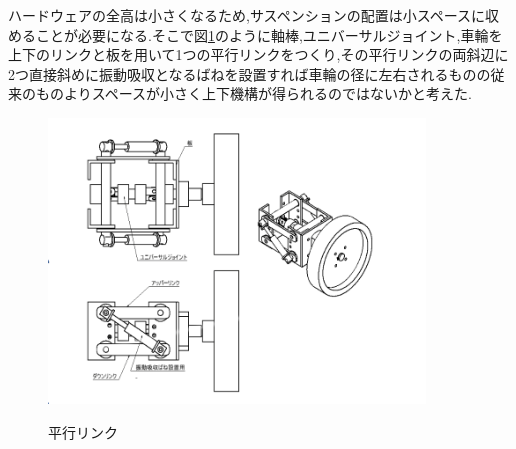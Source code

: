 \documentclass[12pt,oneside]{sotsuken_paper}
\begin{document}
ハードウェアの全高は小さくなるため,サスペンションの配置は小スペースに収めることが必要になる.そこで図\ref{fig:box}のように軸棒,ユニバーサルジョイント,車輪を上下のリンクと板を用いて1つの平行リンクをつくり,その平行リンクの両斜辺に2つ直接斜めに振動吸収となるばねを設置すれば車輪の径に左右されるものの従来のものよりスペースが小さく上下機構が得られるのではないかと考えた. 

\begin{figure}[htbt] 
 \begin{center} 
  \includegraphics[width=100mm]{img/hard/fig4.png} 
 　\caption{平行リンク} 
  \label{fig:box}%
 \end{center} 
\end{figure} 
\end{document}
